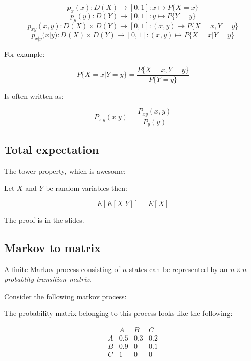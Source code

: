 \documentclass{article}
\begin{document}
\[p_x(x): D(X) \to [0,1]: x \mapsto P\{X=x\} \]
\[p_y(y): D(Y) \to [0,1]: y \mapsto P\{Y=y\} \]
\[p_{xy}(x,y): D(X) \times D(Y) \to [0,1]: (x,y) \mapsto P\{X=x,Y=y\} \]
\[p_{x|y}(x|y): D(X) \times D(Y) \to [0,1]: (x,y) \mapsto P\{X=x|Y=y\} \]

For example:

\[ P\{X=x|Y=y\}=\frac{P\{X=x,Y=y\}}{P\{Y=y\}}\]

Is often written as:

\[P_{x|y}(x|y)=\frac{P_{xy}(x,y)}{P_y(y)}\]

\subsection{Total expectation}
The tower property, which is awesome:

Let $X$ and $Y$ be random variables then:

\[ E[E[X|Y]] = E[X] \]

The proof is in the slides.

\subsection{Markov to matrix}
A finite Markov process consisting of $n$ states can be represented by an 
$n\times n$ \emph{probablity transition matrix}.

Consider the following markov process:
\begin{center}

The probability matrix belonging to this process looks like the following:

\[
\begin{matrix}
		& A		& B		& C \\
	A	& 0.5	& 0.3	& 0.2 \\
	B	& 0.9	& 0		& 0.1 \\
	C	& 1		& 0		& 0 \\
\end{matrix}
\]

\end{center}
\end{document}
